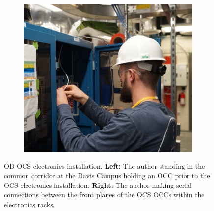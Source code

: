 \begin{figure}[!ht]
\begin{subfigure}{0.47\textwidth}
         \includegraphics[width=\textwidth]{figures/LZ/OCSElectronicsInstallation.png}
         \label{fig:LZ/Gonk1}
     \end{subfigure}
     \caption{OD OCS electronics installation. \textbf{Left:} The author standing in the common corridor at the Davis Campus holding an OCC prior to the OCS electronics installation. \textbf{Right:} The author making serial connections between the front planes of the OCS OCCs within the electronics racks.}
\end{figure}